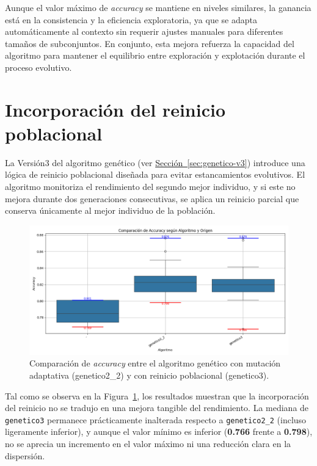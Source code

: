 Aunque el valor máximo de \textit{accuracy} se mantiene en niveles similares, la ganancia está en la consistencia y la eficiencia exploratoria,
ya que se adapta automáticamente al contexto sin requerir ajustes manuales para diferentes tamaños de subconjuntos.
En conjunto, esta mejora refuerza la capacidad del algoritmo para mantener el equilibrio entre exploración y explotación durante el proceso evolutivo.


\section{Incorporación del reinicio poblacional}\label{sec:incorporacion-reinicio-poblacional}
La Versión3 del algoritmo genético (ver \hyperref[sec:genetico-v3]{Sección~\ref*{sec:genetico-v3}})
introduce una lógica de reinicio poblacional diseñada para evitar estancamientos evolutivos.
El algoritmo monitoriza el rendimiento del segundo mejor individuo, y si este no mejora durante dos generaciones consecutivas,
se aplica un reinicio parcial que conserva únicamente al mejor individuo de la población.

\begin{figure}[H]
    \centering
    \includegraphics[width=1\textwidth]{imagenes/evaluaciones/reinicio-poblacional}
    \caption{Comparación de \textit{accuracy} entre el algoritmo genético con mutación adaptativa (genetico2\_2) y con reinicio poblacional (genetico3).}
    \label{fig:reinicio_poblacional}
\end{figure}

Tal como se observa en la Figura~\ref{fig:reinicio_poblacional}, los resultados muestran que la incorporación del reinicio no se tradujo en una mejora tangible del rendimiento.
La mediana de \texttt{genetico3} permanece prácticamente inalterada respecto a \texttt{genetico2\_2} (incluso ligeramente inferior),
y aunque el valor mínimo es inferior (\textbf{0.766} frente a \textbf{0.798}), no se aprecia un incremento en el valor máximo ni una reducción clara en la dispersión.

